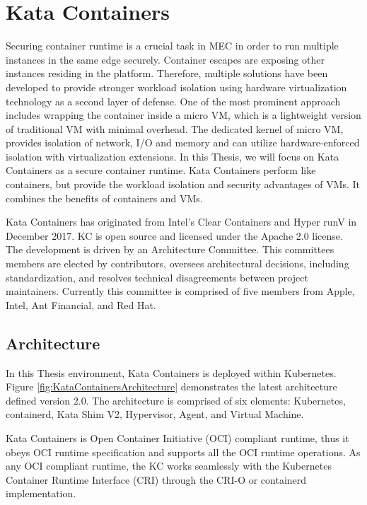 \chapter{Kata Containers}
\label{chapter:katacontainers}

Securing container runtime is a crucial task in MEC in order to run multiple instances in the same edge securely. Container escapes\cite{CVE-2019-5736}\cite{CVE-2020-14386} are exposing other instances residing in the platform. Therefore, multiple solutions have been developed to provide stronger workload isolation using hardware virtualization technology as a second layer of defense. One of the most prominent approach includes wrapping the container inside a micro VM, which is a lightweight version of traditional VM with minimal overhead. The dedicated kernel of micro VM, provides isolation of network, I/O and memory and can utilize hardware-enforced isolation with virtualization extensions. In this Thesis, we will focus on Kata Containers as a secure container runtime. Kata Containers perform like containers, but provide the workload isolation and security advantages of VMs. It combines the benefits of containers and VMs. \cite{KataContainers}

Kata Containers has originated from Intel's Clear Containers \cite{ClearContainers} and Hyper runV \cite{runV} in December 2017. KC is open source and licensed under the Apache 2.0 license. The development is driven by an Architecture Committee. This committees members are elected by contributors, oversees architectural decisions, including standardization, and resolves technical disagreements between project maintainers. Currently this committee is comprised of five members from Apple, Intel, Ant Financial, and Red Hat. \cite{KataContainersGovernance} \cite{KataContainers}

\section{Architecture}

In this Thesis environment, Kata Containers is deployed within Kubernetes. Figure \ref{fig:KataContainersArchitecture} demonstrates the latest architecture defined version 2.0. The architecture is comprised of six elements: Kubernetes, containerd, Kata Shim V2, Hypervisor, Agent, and Virtual Machine.

Kata Containers is Open Container Initiative (OCI)\cite{OCI} compliant runtime, thus it obeys OCI runtime specification and supports all the OCI runtime operations. As any OCI compliant runtime, the KC works seamlessly with the Kubernetes Container Runtime Interface (CRI)\cite{CRI} through the CRI-O or containerd implementation.


